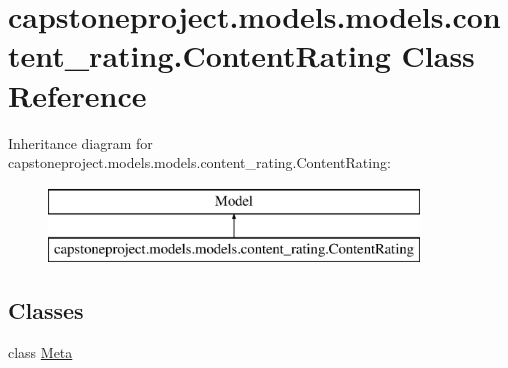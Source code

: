 \hypertarget{classcapstoneproject_1_1models_1_1models_1_1content__rating_1_1_content_rating}{}\section{capstoneproject.\+models.\+models.\+content\+\_\+rating.\+Content\+Rating Class Reference}
\label{classcapstoneproject_1_1models_1_1models_1_1content__rating_1_1_content_rating}
Inheritance diagram for capstoneproject.\+models.\+models.\+content\+\_\+rating.\+Content\+Rating\+:\begin{figure}[H]
\begin{center}
\leavevmode
\includegraphics[height=2.000000cm]{classcapstoneproject_1_1models_1_1models_1_1content__rating_1_1_content_rating}
\end{center}
\end{figure}
\subsection*{Classes}
\begin{DoxyCompactItemize}
\item 
class \mbox{\hyperlink{classcapstoneproject_1_1models_1_1models_1_1content__rating_1_1_content_rating_1_1_meta}{Meta}}
\end{DoxyCompactItemize}
